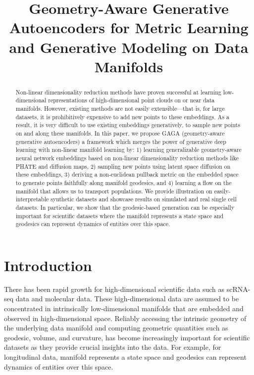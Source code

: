 \documentclass{article}
\title{Geometry-Aware Generative Autoencoders for Metric Learning and Generative Modeling on Data Manifolds}
\author{
}
\theoremstyle{plain}
\theoremstyle{definition}
\theoremstyle{remark}
\begin{document}



\maketitle


\begin{abstract}
Non-linear dimensionality reduction methods have proven successful at learning low-dimensional representations of high-dimensional point clouds on or near data manifolds. However, existing methods are not easily extensible—that is, for large datasets, it is prohibitively expensive to add new points to these embeddings. As a result, it is very difficult to use existing embeddings generatively, to sample new points on and along these manifolds. In this paper, we propose GAGA (geometry-aware generative autoencoders) a framework which merges the power of generative deep learning with non-linear manifold learning by: 1) learning generalizable geometry-aware neural network embeddings based on non-linear dimensionality reduction methods like PHATE and diffusion maps, 2) sampling new points using latent space diffusion on these embeddings, 3) deriving a non-euclidean pullback metric on the embedded space to generate points faithfully along manifold geodesics, and 4) learning a flow on the manifold that allows us to transport populations. We provide illustration on easily-interpretable synthetic datasets and showcase results on simulated and real single cell datasets. In particular, we show that the geodesic-based generation can be especially important for scientific datasets where the manifold represents a state space and geodesics can represent dynamics of entities over this space.  
\end{abstract}

\section{Introduction}
\par There has been rapid growth for high-dimensional scientific data such as scRNA-seq data and molecular data. These high-dimensional data are assumed to be concentrated in intrinsically low-dimensional manifolds that are embedded and observed in high-dimensional space. Reliably accessing the intrinsic geometry of the underlying data manifold and computing geometric quantities such as geodesic, volume, and curvature, has become increasingly important for scientific datasets as they provide crucial insights into the data. For example, for longitudinal data, manifold represents a state space and geodesics can represent dynamics of entities over this space. 
\end{document}
